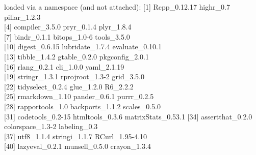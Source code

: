 \documentclass[]{article}
\begin{document}
loaded via a namespace (and not attached): {[}1{]} Rcpp\_0.12.17
highr\_0.7 pillar\_1.2.3\\
{[}4{]} compiler\_3.5.0 pryr\_0.1.4 plyr\_1.8.4\\
{[}7{]} bindr\_0.1.1 bitops\_1.0-6 tools\_3.5.0\\
{[}10{]} digest\_0.6.15 lubridate\_1.7.4 evaluate\_0.10.1\\
{[}13{]} tibble\_1.4.2 gtable\_0.2.0 pkgconfig\_2.0.1\\
{[}16{]} rlang\_0.2.1 cli\_1.0.0 yaml\_2.1.19\\
{[}19{]} stringr\_1.3.1 rprojroot\_1.3-2 grid\_3.5.0\\
{[}22{]} tidyselect\_0.2.4 glue\_1.2.0 R6\_2.2.2\\
{[}25{]} rmarkdown\_1.10 pander\_0.6.1 purrr\_0.2.5\\
{[}28{]} rapportools\_1.0 backports\_1.1.2 scales\_0.5.0\\
{[}31{]} codetools\_0.2-15 htmltools\_0.3.6 matrixStats\_0.53.1 {[}34{]}
assertthat\_0.2.0 colorspace\_1.3-2 labeling\_0.3\\
{[}37{]} utf8\_1.1.4 stringi\_1.1.7 RCurl\_1.95-4.10\\
{[}40{]} lazyeval\_0.2.1 munsell\_0.5.0 crayon\_1.3.4
\end{document}
